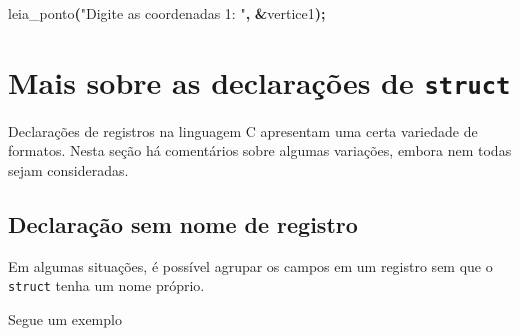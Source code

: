 \documentclass[
  11pt,
  a4paper,
]{scrbook}
\newenvironment{Shaded}{\begin{snugshade}}{\end{snugshade}}
\newcommand{\NormalTok}[1]{#1}
\newcommand{\OperatorTok}[1]{\textcolor[rgb]{0.81,0.36,0.00}{\textbf{#1}}}
\newcommand{\StringTok}[1]{\textcolor[rgb]{0.31,0.60,0.02}{#1}}
\begin{document}
\begin{Shaded}
\begin{Highlighting}[]
\NormalTok{leia\_ponto}\OperatorTok{(}\StringTok{"Digite as coordenadas 1: "}\OperatorTok{,} \OperatorTok{\&}\NormalTok{vertice1}\OperatorTok{);}
\end{Highlighting}
\end{Shaded}

\section{\texorpdfstring{Mais sobre as declarações de
\texttt{struct}}{Mais sobre as declarações de struct}}\label{mais-sobre-as-declarauxe7uxf5es-de-struct}

Declarações de registros na linguagem C apresentam uma certa variedade
de formatos. Nesta seção há comentários sobre algumas variações, embora
nem todas sejam consideradas.

\subsection{Declaração sem nome de
registro}\label{sec-declaracao-struct-sem-nome}

Em algumas situações, é possível agrupar os campos em um registro sem
que o \texttt{struct} tenha um nome próprio.

Segue um exemplo
\end{document}
